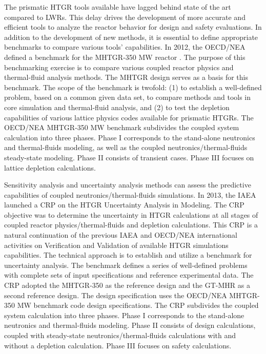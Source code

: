 The prismatic \gls{HTGR} tools available have lagged behind state of the art compared to \glspl{LWR}.
This delay drives the development of more accurate and efficient tools to analyze the reactor behavior for design and safety evaluations.
In addition to the development of new methods, it is essential to define appropriate benchmarks to compare various tools' capabilities.
In 2012, the \gls{OECD}/\gls{NEA} defined a benchmark for the \gls{MHTGR}-350 MW reactor \cite{oecd_nea_benchmark_2017}.
The purpose of this benchmarking exercise is to compare various coupled reactor physics and thermal-fluid analysis methods.
The MHTGR design serves as a basis for this benchmark.
The scope of the benchmark is twofold: (1) to establish a well-defined problem, based on a common given data set, to compare methods and tools in core simulation and thermal-fluid analysis, and (2) to test the depletion capabilities of various lattice physics codes available for prismatic \glspl{HTGR}.
The OECD/NEA MHTGR-350 MW benchmark subdivides the coupled system calculation into three phases.
Phase I corresponds to the stand-alone neutronics and thermal-fluids modeling, as well as the coupled neutronics/thermal-fluids steady-state modeling.
Phase II consists of transient cases.
Phase III focuses on lattice depletion calculations.

Sensitivity analysis and uncertainty analysis methods can assess the predictive capabilities of coupled neutronics/thermal-fluids simulations.
In 2013, the IAEA launched a \gls{CRP} \cite{tyobeka_htgr_2011} on the \gls{HTGR} Uncertainty Analysis in Modeling.
The \gls{CRP} objective was to determine the uncertainty in \gls{HTGR} calculations at all stages of coupled reactor physics/thermal-fluids and depletion calculations.
This \gls{CRP} is a natural continuation of the previous IAEA and OECD/NEA international activities \cite{iaea_evaluation_2003}\cite{reitsma_oecd-neansc_2008} on Verification and Validation of available \gls{HTGR} simulations capabilities.
The technical approach is to establish and utilize a benchmark for uncertainty analysis.
The benchmark defines a series of well-defined problems with complete sets of input specifications and reference experimental data.
The CRP adopted the MHTGR-350 as the reference design and the GT-MHR as a second reference design.
The design specification uses the OECD/NEA MHTGR-350 MW benchmark \cite{oecd_nea_benchmark_2017} code design specifications.
The CRP subdivides the coupled system calculation into three phases.
Phase I corresponds to the stand-alone neutronics and thermal-fluids modeling.
Phase II consists of design calculations, coupled with steady-state neutronics/thermal-fluids calculations with and without a depletion calculation.
Phase III focuses on safety calculations.